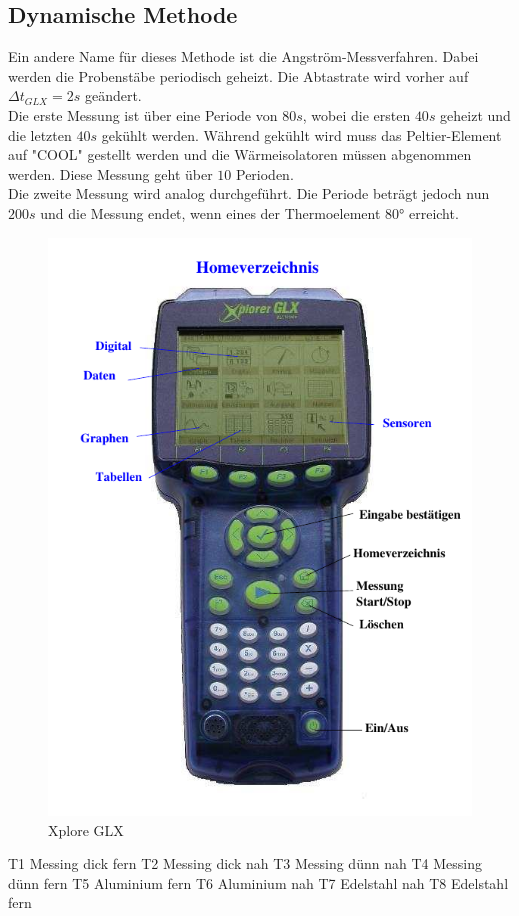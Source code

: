 \subsection{Dynamische Methode}
Ein andere Name für dieses Methode ist die Angström-Messverfahren.
Dabei werden die Probenstäbe periodisch geheizt.
Die Abtastrate wird vorher auf $\Delta t_{GLX} = 2\si{s}$ geändert.\\
Die erste Messung ist über eine Periode von $80\si{s}$, wobei die ersten $40\si{s}$ geheizt und die letzten $40\si{s}$ gekühlt werden.
Während gekühlt wird muss das Peltier-Element auf "COOL" gestellt werden und die Wärmeisolatoren müssen abgenommen werden.
Diese Messung geht über $10$ Perioden.\\
Die zweite Messung wird analog durchgeführt. 
Die Periode beträgt jedoch nun $200 \si{s}$ und die Messung endet, wenn eines der Thermoelement $80°$ erreicht.

\begin{figure}[H]
    \centering
    \includegraphics{content/Abb_2.pdf}
    \caption{Xplore GLX\cite[5]{V204}}
    \label{fig:GLX}
\end{figure}

T1 Messing dick fern
T2 Messing dick nah
T3 Messing dünn nah 
T4 Messing dünn fern
T5 Aluminium fern
T6 Aluminium nah
T7 Edelstahl nah
T8 Edelstahl fern